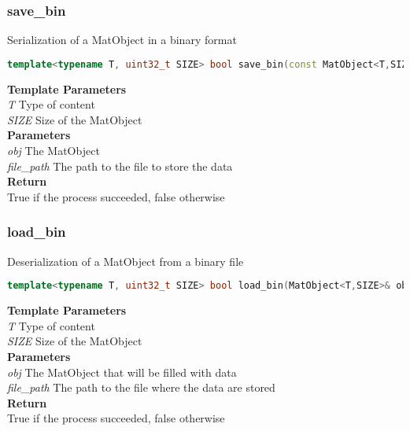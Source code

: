 \subsubsection{save\_bin}
\begin{mdframed}
Serialization of a MatObject in a binary format
\begin{lstlisting}[language=C++]
template<typename T, uint32_t SIZE> bool save_bin(const MatObject<T,SIZE>& obj, std::string file_path) 
\end{lstlisting}
\textbf{Template Parameters} \\ 
\textit{T} Type of content \\ 
\textit{SIZE} Size of the MatObject \\ 
\textbf{Parameters} \\ 
\textit{obj} The MatObject \\ 
\textit{file\_path} The path to the file to store the data \\ 
\textbf{Return} \\ 
True if the process succeeded, false otherwise \\ 
\end{mdframed}

\subsubsection{load\_bin}
\begin{mdframed}
Deserialization of a MatObject from a binary file
\begin{lstlisting}[language=C++]
template<typename T, uint32_t SIZE> bool load_bin(MatObject<T,SIZE>& obj, std::string file_path) 
\end{lstlisting}
\textbf{Template Parameters} \\ 
\textit{T} Type of content \\ 
\textit{SIZE} Size of the MatObject \\ 
\textbf{Parameters} \\ 
\textit{obj} The MatObject that will be filled with data \\ 
\textit{file\_path} The path to the file where the data are stored \\ 
\textbf{Return} \\ 
True if the process succeeded, false otherwise \\ 
\end{mdframed}

